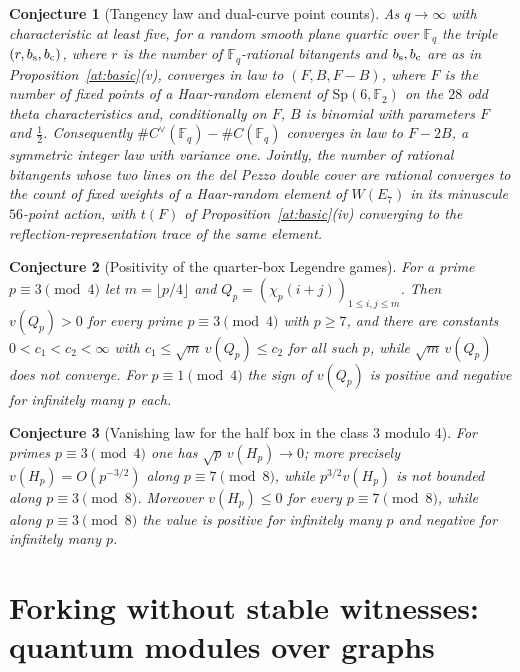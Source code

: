 \documentclass[11pt]{article}
\newtheorem{conjecture}{Conjecture}
\theoremstyle{definition}
\newcommand{\Fq}{\mathbb F}
\begin{document}
\begin{conjecture}[Tangency law and dual-curve point counts]\label{at13}
As $q\to\infty$ with characteristic at least five, for a random smooth
plane quartic over $\Fq_q$ the triple
$(r,b_{\rm s},b_{\rm c})$, where $r$ is the number of $\Fq_q$-rational
bitangents and $b_{\rm s},b_{\rm c}$ are as in
Proposition~\ref{at:basic}(v), converges in law to $(F,B,F-B)$, where $F$ is
the number of fixed points of a Haar-random element of $\mathrm{Sp}(6,\Fq_2)$
on the $28$ odd theta characteristics and, conditionally on $F$, $B$ is
binomial with parameters $F$ and $\tfrac12$.  Consequently
$\#C^\vee(\Fq_q)-\#C(\Fq_q)$ converges in law to $F-2B$, a symmetric
integer law with variance one.  Jointly, the number of rational bitangents
whose two lines on the del Pezzo double cover are rational converges to the
count of fixed weights of a Haar-random element of $W(E_7)$ in its
minuscule $56$-point action, with $t(F)$ of Proposition~\ref{at:basic}(iv)
converging to the reflection-representation trace of the same element.
\end{conjecture}


\begin{conjecture}[Positivity of the quarter-box Legendre games]\label{at14}
For a prime $p\equiv3\pmod4$ let $m=\lfloor p/4\rfloor$ and
$Q_p=(\chi_p(i+j))_{1\le i,j\le m}$.  Then $v(Q_p)>0$ for every prime
$p\equiv3\pmod4$ with $p\ge7$, and there are constants
$0<c_1<c_2<\infty$ with $c_1\le\sqrt m\,v(Q_p)\le c_2$ for all such $p$,
while $\sqrt m\,v(Q_p)$ does not converge.  For $p\equiv1\pmod4$ the sign
of $v(Q_p)$ is positive and negative for infinitely many $p$ each.
\end{conjecture}


\begin{conjecture}[Vanishing law for the half box in the class $3$ modulo $4$]\label{at15}
For primes $p\equiv3\pmod4$ one has $\sqrt p\,v(H_p)\to0$; more precisely
$v(H_p)=O(p^{-3/2})$ along $p\equiv7\pmod8$, while $p^{3/2}v(H_p)$ is not
bounded along $p\equiv3\pmod8$.  Moreover $v(H_p)\le0$ for every
$p\equiv7\pmod8$, while along $p\equiv3\pmod8$ the value is positive for
infinitely many $p$ and negative for infinitely many $p$.
\end{conjecture}

\part{Forking without stable witnesses: quantum modules over graphs}
\end{document}
